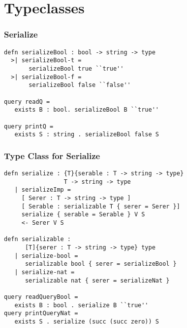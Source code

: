 \section{Typeclasses}
\begin{frame}[fragile]
\frametitle{Serialize}

\begin{lstlisting}
defn serializeBool : bool -> string -> type
  >| serializeBool-t = 
       serializeBool true ``true''
  >| serializeBool-f = 
       serializeBool false ``false''

query readQ = 
   exists B : bool. serializeBool B ``true''

query printQ = 
   exists S : string . serializeBool false S
\end{lstlisting}

\end{frame}

\begin{frame}[fragile]
\frametitle{Type Class for Serialize}

\begin{lstlisting}
defn serialize : {T}{serable : T -> string -> type} 
                 T -> string -> type
   | serializeImp = 
     [ Serer : T -> string -> type ]
     [ Serable : serializable T { serer = Serer }]
     serialize { serable = Serable } V S
     <- Serer V S

defn serializable : 
      [T]{serer : T -> string -> type} type
   | serialize-bool = 
      serializable bool { serer = serializeBool }
   | serialize-nat = 
      serializable nat { serer = serializeNat }

query readQueryBool = 
   exists B : bool . serialize B ``true''
query printQueryNat = 
   exists S . serialize (succ (succ zero)) S
\end{lstlisting}

\end{frame}

